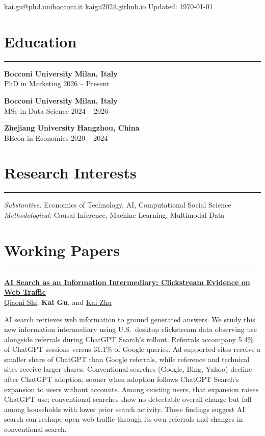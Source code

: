 \documentclass[a4paper,10pt]{article}
\begin{document}
\vspace{2pt}

\faEnvelope\; \href{mailto:kai.gu@phd.unibocconi.it}{kai.gu@phd.unibocconi.it} \quad
\faGlobe\; \href{https://kaigu2024.github.io}{kaigu2024.github.io} \quad
\faClock\; Updated: \today

\section*{Education}
\hrule
\vspace{2pt}
\textbf{Bocconi University} \hfill \textbf{Milan, Italy} \\
PhD in Marketing \hfill 2026 -- Present

\vspace{4pt}
\textbf{Bocconi University} \hfill \textbf{Milan, Italy} \\
MSc in Data Science \hfill 2024 -- 2026

\vspace{4pt}
\textbf{Zhejiang University} \hfill \textbf{Hangzhou, China} \\
BEcon in Economics \hfill 2020 -- 2024

\section*{Research Interests}
\hrule
\vspace{2pt}
\textit{Substantive:} Economics of Technology, AI, Computational Social Science \\
\textit{Methodological:} Causal Inference, Machine Learning, Multimodal Data

\section*{Working Papers}
\hrule
\vspace{2pt}
\href{https://arxiv.org/abs/2607.07652}{\textbf{AI Search as an Information Intermediary: Clickstream Evidence on Web Traffic}}\\
\href{https://qiaonishi.github.io/}{Qiaoni Shi}, \textbf{Kai Gu}, and \href{https://kaizhu.me/}{Kai Zhu}

{\small AI search retrieves web information to ground generated answers. We study this new information intermediary using U.S.\ desktop clickstream data observing use alongside referrals during ChatGPT Search's rollout. Referrals accompany 5.4\% of ChatGPT sessions versus 31.1\% of Google queries. Ad-supported sites receive a smaller share of ChatGPT than Google referrals, while reference and technical sites receive larger shares. Conventional searches (Google, Bing, Yahoo) decline after ChatGPT adoption, sooner when adoption follows ChatGPT Search's expansion to users without accounts. Among existing users, that expansion raises ChatGPT use; conventional searches show no detectable overall change but fall among households with lower prior search activity. These findings suggest AI search can reshape open-web traffic through its own referrals and changes in conventional search.}
\end{document}
